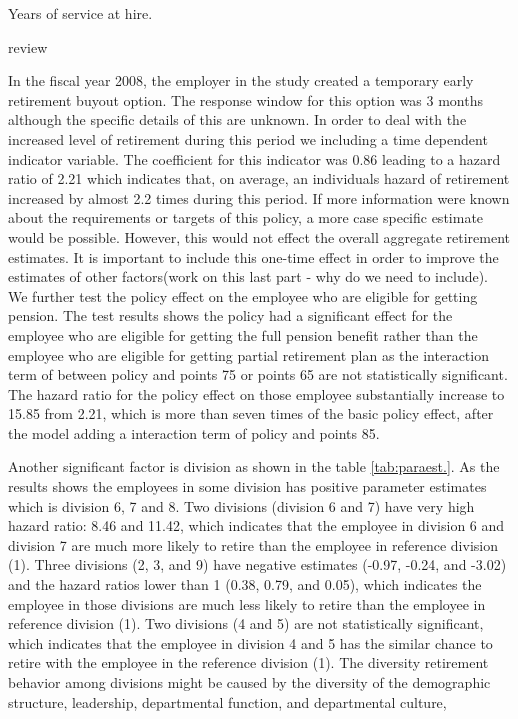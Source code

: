 \documentclass[12pt,letterpaper]{article}
\begin{document}
\begin{enumerate}
Years of service at hire.


\citet{Wang2010} review

In the fiscal year 2008, the employer in the study created a temporary early retirement buyout option. The response window for this option was 3 months although the specific details of this are unknown. In order to deal with the increased level of retirement during this period we including a time dependent indicator variable.  The coefficient for this indicator was 0.86 leading to a hazard ratio of 2.21 which indicates that, on average, an individuals hazard of retirement increased by almost 2.2 times during this period.  If more information were known about the requirements or targets of this policy, a more case specific estimate would be possible.  However, this would not effect the overall aggregate retirement estimates.  It is important to include this one-time effect in order to improve the estimates of other factors(work on this last part - why do we need to include). We further test the policy effect on the employee who are eligible for getting pension. The test results shows the policy had a significant effect for the employee who are eligible for getting the full pension benefit rather than the employee who are eligible for getting partial retirement plan as the interaction term of between policy and points 75 or points 65 are not statistically significant. The hazard ratio for the policy effect on those employee substantially increase to 15.85 from 2.21, which is more than seven times of the basic policy effect, after the model adding a interaction term of policy and points 85.

Another significant factor is division as shown in the table \ref{tab:paraest.}. As the results shows the employees in some division has positive parameter estimates which is division 6, 7 and 8. Two divisions (division 6 and 7) have very high hazard ratio: 8.46 and 11.42, which indicates that the employee in division 6 and division 7 are much more likely to retire than the employee in reference division (1). Three divisions (2, 3, and 9) have negative estimates (-0.97, -0.24, and -3.02) and the hazard ratios lower than 1 (0.38, 0.79, and 0.05), which indicates the employee in those divisions are much less likely to retire than the employee in reference division (1). Two divisions (4 and 5) are not statistically significant, which indicates that the employee in division 4 and 5 has the similar chance to retire with the employee in the reference division (1). The diversity retirement behavior among divisions might be caused by the diversity of the demographic structure, leadership, departmental function, and departmental culture,


\end{enumerate}
\end{document}

